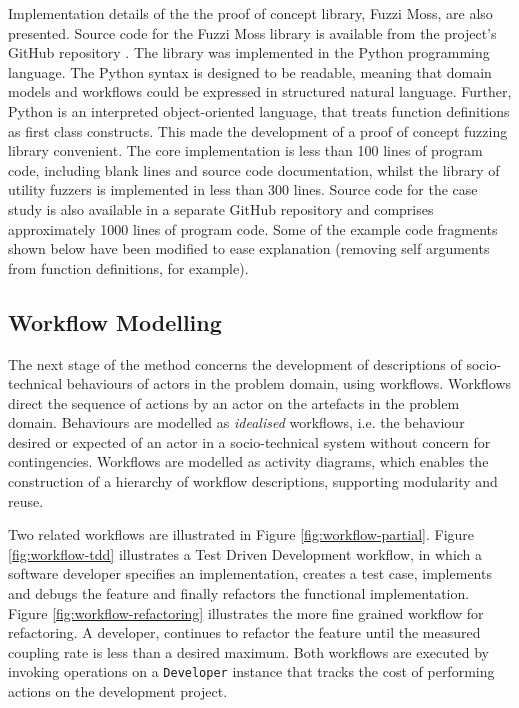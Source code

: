 \documentclass{sig-alternate}
\begin{document}
Implementation details of the the proof of concept library, Fuzzi Moss, are also presented.  Source code for the Fuzzi
Moss library is available from the project's GitHub repository \citep{wallis2016fuzzi-moss-scm}.  The library was
implemented in the Python programming language.  The Python syntax is designed to be readable, meaning that domain
models and workflows could be expressed in structured natural language.  Further, Python is an interpreted
object-oriented language, that treats function definitions as first class constructs.  This made the development of a
proof of concept fuzzing library convenient.  The core implementation is less than 100 lines of program code, including
blank lines and source code documentation, whilst the library of utility fuzzers is implemented in less than 300
lines. Source code for the case study is also available in a separate GitHub repository
\citep{storer2016softdev-workflow-scm} and comprises approximately 1000 lines of program code.  Some of the example code
fragments shown below have been modified to ease explanation (removing self arguments from function definitions, for
example).



\subsection{Workflow Modelling}


The next stage of the method concerns the development of descriptions of socio-technical behaviours of actors in the
problem domain, using workflows.  Workflows direct the sequence of actions by an actor on the artefacts in the problem
domain.  Behaviours are modelled as \emph{idealised} workflows, i.e. the behaviour desired or expected of an actor in a
socio-technical system without concern for contingencies.  Workflows are modelled as activity diagrams, which enables
the construction of a hierarchy of workflow descriptions, supporting modularity and reuse.

Two related workflows are illustrated in Figure \ref{fig:workflow-partial}.  Figure \ref{fig:workflow-tdd} illustrates a
Test Driven Development workflow, in which a software developer specifies an implementation, creates a test case,
implements and debugs the feature and finally refactors the functional implementation.  Figure
\ref{fig:workflow-refactoring} illustrates the more fine grained workflow for refactoring.  A developer, continues to
refactor the feature until the measured coupling rate is less than a desired maximum.  Both workflows are executed by
invoking operations on a \lstinline!Developer!  instance that tracks the cost of performing actions on the development
project.
\end{document}
